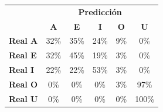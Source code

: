 \begin{tabular}{lccccc}
\toprule
 & \multicolumn{5}{c}{\textbf{Predicción}} \\
 & \textbf{A} & \textbf{E} & \textbf{I} & \textbf{O} & \textbf{U} \\
\midrule
\textbf{Real A} & \cellcolor[rgb]{0.77,0.77,1.00}  32\% & \cellcolor[rgb]{0.75,0.75,1.00}  35\% & \cellcolor[rgb]{0.84,0.84,1.00}  24\% & \cellcolor[rgb]{0.94,0.94,1.00}  9\% & \cellcolor[rgb]{1.00,1.00,1.00}  0\% \\
\textbf{Real E} & \cellcolor[rgb]{0.77,0.77,1.00}  32\% & \cellcolor[rgb]{0.68,0.68,1.00}  45\% & \cellcolor[rgb]{0.86,0.86,1.00}  19\% & \cellcolor[rgb]{0.98,0.98,1.00}  3\% & \cellcolor[rgb]{1.00,1.00,1.00}  0\% \\
\textbf{Real I} & \cellcolor[rgb]{0.84,0.84,1.00}  22\% & \cellcolor[rgb]{0.84,0.84,1.00}  22\% & \cellcolor[rgb]{0.63,0.63,1.00} \color{white} 53\% & \cellcolor[rgb]{0.98,0.98,1.00}  3\% & \cellcolor[rgb]{1.00,1.00,1.00}  0\% \\
\textbf{Real O} & \cellcolor[rgb]{1.00,1.00,1.00}  0\% & \cellcolor[rgb]{1.00,1.00,1.00}  0\% & \cellcolor[rgb]{1.00,1.00,1.00}  0\% & \cellcolor[rgb]{0.98,0.98,1.00}  3\% & \cellcolor[rgb]{0.32,0.32,1.00} \color{white} 97\% \\
\textbf{Real U} & \cellcolor[rgb]{1.00,1.00,1.00}  0\% & \cellcolor[rgb]{1.00,1.00,1.00}  0\% & \cellcolor[rgb]{1.00,1.00,1.00}  0\% & \cellcolor[rgb]{1.00,1.00,1.00}  0\% & \cellcolor[rgb]{0.30,0.30,1.00} \color{white} 100\% \\
\bottomrule
\end{tabular}